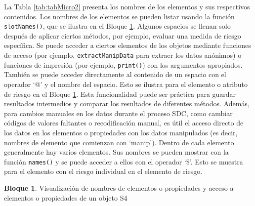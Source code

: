 \documentclass[
]{book}
\newenvironment{Shaded}{\begin{snugshade}}{\end{snugshade}}
\newcommand{\CommentTok}[1]{\textcolor[rgb]{0.56,0.35,0.01}{\textit{#1}}}
\newcommand{\DocumentationTok}[1]{\textcolor[rgb]{0.56,0.35,0.01}{\textbf{\textit{#1}}}}
\newcommand{\FunctionTok}[1]{\textcolor[rgb]{0.00,0.00,0.00}{#1}}
\newcommand{\NormalTok}[1]{#1}
\newcommand{\SpecialCharTok}[1]{\textcolor[rgb]{0.00,0.00,0.00}{#1}}
\newcommand{\StringTok}[1]{\textcolor[rgb]{0.31,0.60,0.02}{#1}}
\theoremstyle{definition}
\theoremstyle{definition}
\newtheorem{example}{Bloque}[chapter]
\theoremstyle{definition}
\theoremstyle{definition}
\theoremstyle{remark}
\begin{document}
La Tabla \ref{tab:tabMicro2} presenta los nombres de los elementos y sus respectivos contenidos. Los nombres de los elementos se pueden listar usando la función \texttt{slotNames()}, que se ilustra en el Bloque \ref{exm:bloqueMicro9}. Algunos espacios se llenan solo después de aplicar ciertos métodos, por ejemplo, evaluar una medida de riesgo específica. Se puede acceder a ciertos elementos de los objetos mediante funciones de acceso (por ejemplo, \texttt{extractManipData} para extraer los datos anónimos) o funciones de impresión (por ejemplo, \texttt{print()}) con los argumentos apropiados. También se puede acceder directamente al contenido de un espacio con el operador `@' y el nombre del espacio. Esto se ilustra para el elemento o atributo de riesgo en el Bloque \ref{exm:bloqueMicro9}. Esta funcionalidad puede ser práctica para guardar resultados intermedios y comparar los resultados de diferentes métodos. Además, para cambios manuales en los datos durante el proceso SDC, como cambiar códigos de valores faltantes o recodificación manual, es útil el acceso directo de los datos en los elementos o propiedades con los datos manipulados (es decir, nombres de elemento que comienzan con `manip'). Dentro de cada elemento generalmente hay varios elementos. Sus nombres se pueden mostrar con la función \texttt{names()} y se puede acceder a ellos con el operador `\$'. Esto se muestra para el elemento con el riesgo individual en el elemento de riesgo.

\begin{example}
\protect\hypertarget{exm:bloqueMicro9}{}\label{exm:bloqueMicro9}Visualización de nombres de elementos o propiedades y acceso a elementos o propiedades de un objeto S4
\end{example}

\begin{Shaded}
\end{Shaded}
\end{document}
